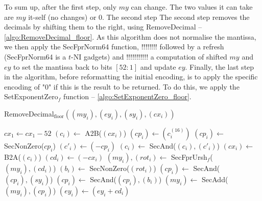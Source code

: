 \documentclass[runningheads]{llncs}
\begin{document}
        To sum up, after the first step, only $my$ can change. The two values it can take are $my$ it-self (no changes) or $0$.
        The second step 
        The second step removes the decimals by shifting them to the right, using RemoveDecimal -- \autoref{algo:RemoveDecimal_floor}. 
        As this algorithm does not normalise the mantissa, we then apply the SecFprNorm64 function, !!!!!!!! followed by a refresh (SecFprNorm64 is a $t$-NI gadgets) and !!!!!!!!!!! a computation of shifted $my$ and $ey$ to set the mantissa back to bits $[52:1]$ and update $ey$.
        Finally, the last step in the algorithm, before reformatting the initial encoding, is to apply the specific encoding of "0" if this is the result to be returned.
        To do this, we apply the SetExponentZero$_f$ function -- \autoref{algo:SetExponentZero_floor}. 
        \begin{algorithm}
            \caption{RemoveDecimal$_{\text{floor}}((my_i), (ey_i), (sy_i), (cx_i))$}
            \label{algo:RemoveDecimal_floor}
            $cx_1 \leftarrow cx_1 - 52$\;%
            $(c_i) \leftarrow$ A2B($(cx_i)$)\;
            $(cp_i) \leftarrow (c_i^{(16)})$\;
            $(cp_i) \leftarrow$ SecNonZero($cp_i$)\;
            $(c'_i) \leftarrow (- cp_i)$\;%
            $(c_i) \leftarrow$ SecAnd($(c_i), (c'_i)$)\;
            $(cx_i) \leftarrow$ B2A($(c_i)$)\;
            $(cd_i) \leftarrow (-cx_i)$\;
            $(my_i), (rot_i) \leftarrow$ SecFprUrsh$_f$($(my_i), (cd_i)$)\;%
            $(b_i) \leftarrow$ SecNonZero($(rot_i)$)\;%
            $(cp_i) \leftarrow$ SecAnd($(cp_i), (sy_i)$)\; 
            $(cp_i) \leftarrow$ SecAnd($(cp_i), (b_i)$)\; 
            $(my_i)\leftarrow$ SecAdd($(my_i), (cp_i)$)\;%
            $(ey_i) \leftarrow (ey_i + cd_i)$\; 
          \;
          \end{algorithm}
\end{document}
